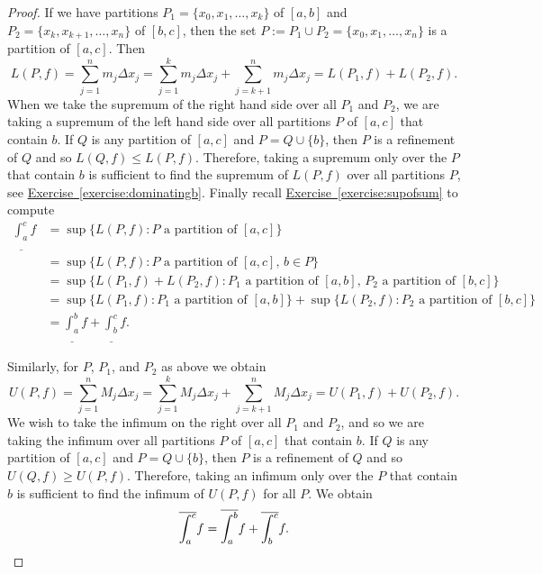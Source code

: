 \documentclass[12pt]{book}
\theoremstyle{plain}
\theoremstyle{remark}
\theoremstyle{definition}
\theoremstyle{exercise}
\theoremstyle{example}
\newcommand{\exerciseref}[1]{\hyperref[#1]{Exercise~\ref*{#1}}}
\begin{document}
\begin{proof}
If we have partitions $P_1 = \{ x_0,x_1,\ldots,x_k \}$
of $[a,b]$ and $P_2 = \{ x_k, x_{k+1}, \ldots, x_n \}$ of $[b,c]$,
then the set $P := P_1 \cup P_2 = \{ x_0, x_1, \ldots, x_n \}$ is
a partition of $[a,c]$.  Then
\begin{equation*}
L(P,f) =
\sum_{j=1}^n m_j \Delta x_j
=
\sum_{j=1}^k m_j \Delta x_j
+
\sum_{j=k+1}^n m_j \Delta x_j
=
L(P_1,f) + L(P_2,f) .
\end{equation*}
When we take the supremum of the right hand side over all $P_1$ and $P_2$,
we are taking a supremum of the left hand side
over all partitions $P$ of $[a,c]$ that contain $b$.  If $Q$ is any partition
of $[a,c]$ and $P = Q \cup \{ b \}$, then $P$ is a refinement of $Q$
and so $L(Q,f) \leq L(P,f)$.  Therefore, taking a supremum only over the $P$
that contain $b$ is sufficient to find the supremum of $L(P,f)$
over all partitions $P$, see \exerciseref{exercise:dominatingb}.
Finally recall \exerciseref{exercise:supofsum}
to compute
\begin{equation*}
\begin{split}
\underline{\int_a^c} f
& =
\sup \{ L(P,f) : \text{$P$ a partition of $[a,c]$} \}
\\
& =
\sup \{ L(P,f) : \text{$P$ a partition of $[a,c]$, $b \in P$} \}
\\
& =
\sup \{ L(P_1,f) + L(P_2,f) :
\text{$P_1$ a partition of $[a,b]$, $P_2$ a partition of $[b,c]$} \}
\\
& =
\sup \{ L(P_1,f) : \text{$P_1$ a partition of $[a,b]$} \}
+
\sup \{ L(P_2,f) : \text{$P_2$ a partition of $[b,c]$} \}
\\
&=
\underline{\int_a^b} f + \underline{\int_b^c} f .
\end{split}
\end{equation*}

Similarly, for $P$, $P_1$, and $P_2$ as above we obtain
\begin{equation*}
U(P,f) =
\sum_{j=1}^n M_j \Delta x_j
=
\sum_{j=1}^k M_j \Delta x_j
+
\sum_{j=k+1}^n M_j \Delta x_j
=
U(P_1,f) + U(P_2,f) .
\end{equation*}
We wish to take the infimum on the right
over all $P_1$ and $P_2$, and so we are taking the infimum
over all partitions $P$ of $[a,c]$ that contain $b$.  If $Q$ is any partition
of $[a,c]$ and $P = Q \cup \{ b \}$, then $P$ is a refinement of $Q$
and so $U(Q,f) \geq U(P,f)$.  Therefore, taking an infimum only over the $P$
that contain $b$ is sufficient to find the infimum of $U(P,f)$ for
all $P$.
We obtain
\begin{equation*}
\overline{\int_a^c} f
=
\overline{\int_a^b} f + \overline{\int_b^c} f .  \qedhere
\end{equation*}
\end{proof}
\end{document}
